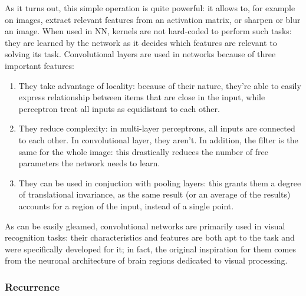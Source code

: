 \documentclass[../main.tex]{subfiles}
\begin{document}
As it turns out, this simple operation is quite powerful: it allows to, for example on images, extract relevant features from an activation matrix, or sharpen or blur an image. When used in NN, kernels are not hard-coded to perform such tasks: they are learned by the network as it decides which features are relevant to solving its task. Convolutional layers are used in networks because of three important features:
\begin{enumerate}
    \item They take advantage of locality: because of their nature, they're able to easily express relationship between items that are close in the input, while perceptron treat all inputs as equidistant to each other.
    \item They reduce complexity: in multi-layer perceptrons, all inputs are connected to each other. In convolutional layer, they aren't. In addition, the filter is the same for the whole image: this drastically reduces the number of free parameters the network needs to learn.
    \item They can be used in conjuction with pooling layers: this grants them a degree of translational invariance, as the same result (or an average of the results) accounts for a region of the input, instead of a single point.
\end{enumerate}

As can be easily gleamed, convolutional networks are primarily used in visual recognition tasks: their characteristics and features are both apt to the task and were specifically developed for it; in fact, the original inspiration for them comes from the neuronal architecture of brain regions dedicated to visual processing.

\subsubsection{Recurrence}
\end{document}
